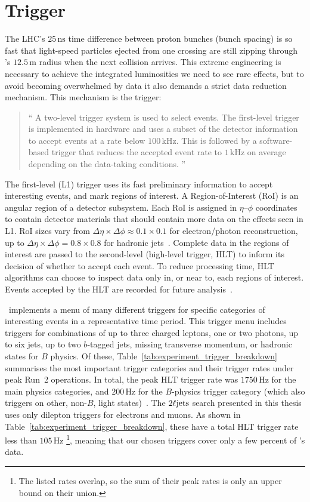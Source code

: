 \section{Trigger}
\label{sec:atlas_trigger}
The LHC's $25\,\mathrm{ns}$ time difference between proton bunches
(bunch spacing) is so fast that light-speed particles ejected from one crossing
are still zipping through \atlas's $12.5\,\textrm{m}$ radius when the next
collision arrives.
This extreme engineering is necessary to achieve the integrated luminosities we
need to see rare effects, but to avoid becoming overwhelmed
by data it also demands a strict data reduction mechanism.
This mechanism is the trigger:
\begin{quote}
``%
A two-level trigger system is used to select events.
The first-level trigger is implemented in hardware and uses a subset of the
detector information to accept events at a rate below $100\,\mathrm{kHz}$.
This is followed by a software-based trigger that reduces the accepted event
rate to $1\,\mathrm{kHz}$ on average depending on the data-taking conditions.%
''~\cite{atlas2022searches}
\end{quote}
The first-level (L1) trigger uses its fast preliminary information to accept
interesting events, and mark regions of interest.
A Region-of-Interest (RoI) is an angular region of a detector subsystem.
Each RoI is assigned in $\eta\textrm{--}\phi$ coordinates to contain detector materials
that should contain more data on the effects seen in L1.
RoI sizes vary from
$\Delta\eta \times \Delta\phi \approx 0.1 \times 0.1$ for electron/photon
reconstruction, up to
$\Delta\eta \times \Delta\phi = 0.8 \times 0.8$ for
hadronic jets~\cite{atlas2016trigger}.
Complete data in the regions of interest are passed to the second-level
(high-level trigger, HLT) to inform its decision of whether to accept each
event.
To reduce processing time, HLT algorithms can choose to inspect data only in,
or near to, each regions of interest.
Events accepted by the HLT are recorded for future analysis~\cite{
atlas2016trigger,
atlas2008experiment
}.

\atlas\ implements a menu of many different triggers for specific categories of
interesting events in a representative time period.
This trigger menu includes triggers for combinations of up to three charged
leptons, one or two photons, up to six jets, up to two $b$-tagged jets, missing
transverse momentum, or hadronic states for $B$ physics.
Of these, Table~\ref{tab:experiment_trigger_breakdown} summarises the most
important trigger categories and their trigger rates under peak Run~2
operations.
In total, the peak HLT trigger rate was $1750\,\mathrm{Hz}$ for the main
physics categories, and $200\,\mathrm{Hz}$ for the $B$-physics trigger category
(which also triggers on other, non-$B$, light
states)~\cite{ATL-DAQ-PUB-2019-001}.
The $2\ell\mathrm{jets}$ search presented in this thesis uses only dilepton triggers
for electrons and muons.
As shown in Table~\ref{tab:experiment_trigger_breakdown}, these have a total
HLT trigger rate less than $105\,\mathrm{Hz}$%
\footnote{%
The listed rates overlap, so the sum of their peak rates is only an upper
bound on their union.
},
meaning that our chosen triggers cover only a few percent of \atlas's data.

